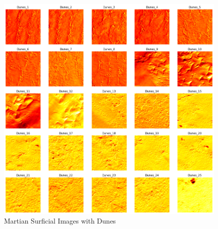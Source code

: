 \documentclass[conference]{IEEEtran}
\begin{document}
\begin{figure}[htbp]
\label{fig4}
\centerline{\includegraphics[width = \linewidth]{4}}
\caption{Martian Surficial Images with Dunes}
\end{figure}
\end{document}
